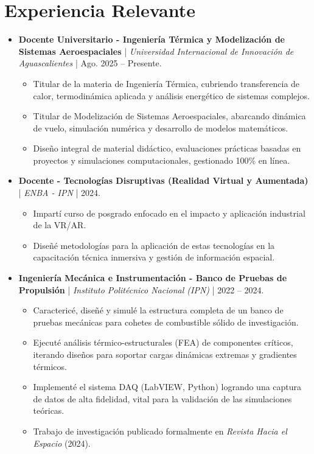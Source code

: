 \documentclass[10pt,letterpaper]{article}
\begin{document}
\section*{Experiencia Relevante}
\begin{itemize}[leftmargin=*, itemsep=0.5ex]
    \item \textbf{Docente Universitario - Ingeniería Térmica y Modelización de Sistemas Aeroespaciales} | \textit{Universidad Internacional de Innovación de Aguascalientes} | Ago. 2025 -- Presente.
    \begin{itemize}[itemsep=0.1ex]
        \item Titular de la materia de Ingeniería Térmica, cubriendo transferencia de calor, termodinámica aplicada y análisis energético de sistemas complejos.
        \item Titular de Modelización de Sistemas Aeroespaciales, abarcando dinámica de vuelo, simulación numérica y desarrollo de modelos matemáticos.
        \item Diseño integral de material didáctico, evaluaciones prácticas basadas en proyectos y simulaciones computacionales, gestionado 100\% en línea.
    \end{itemize}
    \item \textbf{Docente - Tecnologías Disruptivas (Realidad Virtual y Aumentada)} | \textit{ENBA - IPN} | 2024.
    \begin{itemize}[itemsep=0.1ex]
        \item Impartí curso de posgrado enfocado en el impacto y aplicación industrial de la VR/AR.
        \item Diseñé metodologías para la aplicación de estas tecnologías en la capacitación técnica inmersiva y gestión de información espacial.
    \end{itemize}
    \item \textbf{Ingeniería Mecánica e Instrumentación - Banco de Pruebas de Propulsión} | \textit{Instituto Politécnico Nacional (IPN)} | 2022 -- 2024.
    \begin{itemize}[itemsep=0.1ex]
        \item Caractericé, diseñé y simulé la estructura completa de un banco de pruebas mecánicas para cohetes de combustible sólido de investigación.
        \item Ejecuté análisis térmico-estructurales (FEA) de componentes críticos, iterando diseños para soportar cargas dinámicas extremas y gradientes térmicos.
        \item Implementé el sistema DAQ (LabVIEW, Python) logrando una captura de datos de alta fidelidad, vital para la validación de las simulaciones teóricas.
        \item Trabajo de investigación publicado formalmente en \textit{Revista Hacia el Espacio} (2024).
    \end{itemize}
\end{itemize}
\end{document}
